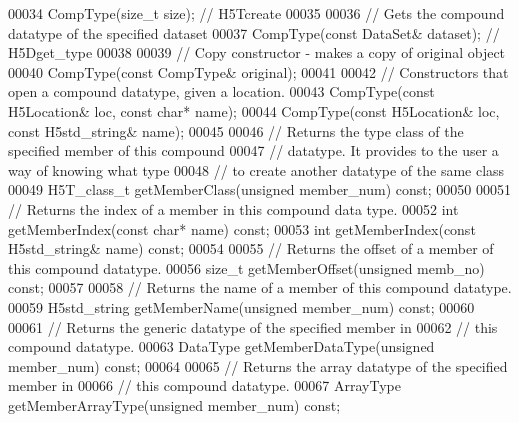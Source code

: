 \begin{DoxyCode}
00034         CompType(\textcolor{keywordtype}{size\_t} size); \textcolor{comment}{// H5Tcreate}
00035 
00036         \textcolor{comment}{// Gets the compound datatype of the specified dataset}
00037         CompType(\textcolor{keyword}{const} DataSet& dataset);  \textcolor{comment}{// H5Dget\_type}
00038 
00039         \textcolor{comment}{// Copy constructor - makes a copy of original object}
00040         CompType(\textcolor{keyword}{const} CompType& original);
00041 
00042         \textcolor{comment}{// Constructors that open a compound datatype, given a location.}
00043         CompType(\textcolor{keyword}{const} H5Location& loc, \textcolor{keyword}{const} \textcolor{keywordtype}{char}* name);
00044         CompType(\textcolor{keyword}{const} H5Location& loc, \textcolor{keyword}{const} H5std\_string& name);
00045 
00046         \textcolor{comment}{// Returns the type class of the specified member of this compound}
00047         \textcolor{comment}{// datatype.  It provides to the user a way of knowing what type}
00048         \textcolor{comment}{// to create another datatype of the same class}
00049         H5T\_class\_t getMemberClass(\textcolor{keywordtype}{unsigned} member\_num) \textcolor{keyword}{const};
00050 
00051         \textcolor{comment}{// Returns the index of a member in this compound data type.}
00052         \textcolor{keywordtype}{int} getMemberIndex(\textcolor{keyword}{const} \textcolor{keywordtype}{char}* name) \textcolor{keyword}{const};
00053         \textcolor{keywordtype}{int} getMemberIndex(\textcolor{keyword}{const} H5std\_string& name) \textcolor{keyword}{const};
00054 
00055         \textcolor{comment}{// Returns the offset of a member of this compound datatype.}
00056         \textcolor{keywordtype}{size\_t} getMemberOffset(\textcolor{keywordtype}{unsigned} memb\_no) \textcolor{keyword}{const};
00057 
00058         \textcolor{comment}{// Returns the name of a member of this compound datatype.}
00059         H5std\_string getMemberName(\textcolor{keywordtype}{unsigned} member\_num) \textcolor{keyword}{const};
00060 
00061         \textcolor{comment}{// Returns the generic datatype of the specified member in}
00062         \textcolor{comment}{// this compound datatype.}
00063         DataType getMemberDataType(\textcolor{keywordtype}{unsigned} member\_num) \textcolor{keyword}{const};
00064 
00065         \textcolor{comment}{// Returns the array datatype of the specified member in}
00066         \textcolor{comment}{// this compound datatype.}
00067         ArrayType getMemberArrayType(\textcolor{keywordtype}{unsigned} member\_num) \textcolor{keyword}{const};

\end{DoxyCode}

